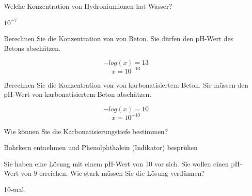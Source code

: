 \begin{questions}
\question[1]
Welche Konzentration von Hydroniumionen hat Wasser?

\begin{solutionorbox}[3cm]
$10^{-7}$
\end{solutionorbox}

\question[1]
Berechnen Sie die Konzentration von  von  Beton. Sie dürfen den pH-Wert des Betons abschätzen.
\begin{solutionorbox}[3cm]
\begin{equation*}
    -log(x) = 13
\end{equation*}
\begin{equation*}
    x = 10^{-13}
\end{equation*}
\end{solutionorbox}

\question[1]

Berechnen Sie die Konzentration von  von karbonatisiertem Beton. Sie müssen den pH-Wert von karbonatisiertem Beton abschätzen.

\begin{solutionorbox}[3cm]
\begin{equation*}
    -log(x) = 10
\end{equation*}
\begin{equation*}
    x = 10^{-10}
\end{equation*}
\end{solutionorbox}

\ifprintanswers
{}
\else
\clearpage
\fi

\question[1]
Wie können Sie die Karbonatisierungstiefe bestimmen?
\begin{solutionorbox}[3cm]
Bohrkern entnehmen und Phenolphthalein (Indikator) besprühen
\end{solutionorbox}

\question[1]
Sie haben eine Lösung mit einem pH-Wert von 10 vor sich. Sie wollen einen pH-Wert von 9 erreichen. 
Wie stark müssen Sie die Lösung verdünnen?
\begin{solutionorbox}[3cm]
10-mal.
\end{solutionorbox}


%
%
%





\end{questions}




	
	

